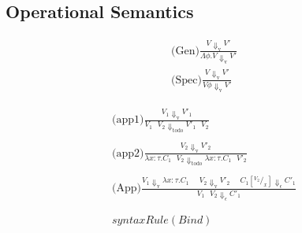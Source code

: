 \documentclass[twoside,a4paper,11pt]{article}
\newcommand{\s}{\mbox{ }}
\newcommand{\syntaxRule}[3]{\displaystyle\mbox{#1}\frac{#2}{#3}}
\newcommand{\sub}[2]{\left[^{#1}/_{#2}\right]}
\newcommand{\goesTo}[3]{#1 \Downarrow_{\text{#3}} #2}
\begin{document}
\subsection{Operational Semantics}

\begin{equation}
\begin{array}{c}

\syntaxRule{(Gen)}{\goesTo{V}{V'}{v}}{\goesTo{\Lambda \phi. V}{V'}{v}}
 \\

\syntaxRule{(Spec)}{\goesTo{V}{V'}{v}}{\goesTo{V \phi}{V'}{v}}

\end{array}
\end{equation}

\begin{equation}
\begin{array}{c}

\syntaxRule{(app1)}{\goesTo{V_1}{V'_1}{v}}{\goesTo{V_1\s V_2}{V'_1\s V_2}{todo}}
 \\\\
 
 \syntaxRule{(app2)}{\goesTo{V_2}{V'_2}{v}}{\goesTo{\lambda x: \tau. C_1\s V_2}{\lambda x: \tau. C_1\s V'_2}{todo}}
 \\\\
 
 
\syntaxRule{(App)}
{\goesTo{V_1}{\lambda x: \tau. C_1}{v}\s\s \goesTo{V_2 }{V'_2}{v}\s\s \goesTo{C_1 \sub{V_2}{x}}{C'_1}{$\epsilon$}}{\goesTo{V_1\s V_2}{C'_1}{$\epsilon$}}
\\
\\

\\syntaxRule{(Bind)}

\end{array}
\end{equation}
\end{document}
